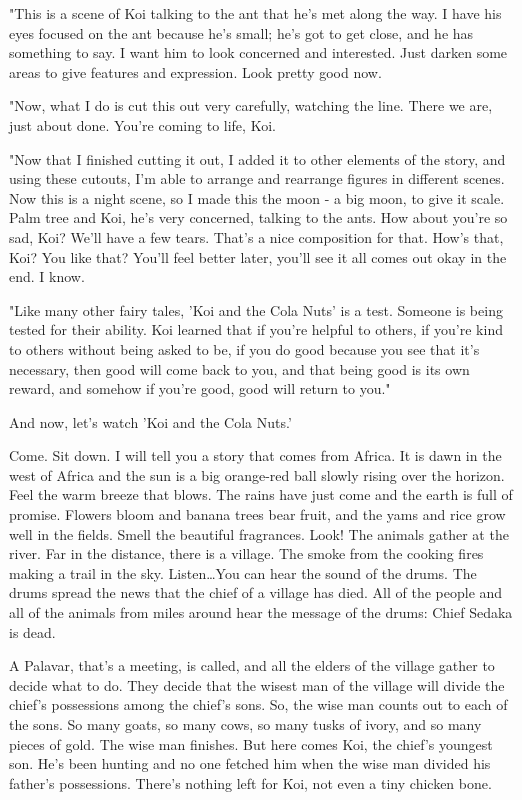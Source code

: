 "This is a scene of Koi talking to the ant that he's met along the way. I have his eyes focused on the ant because he's small; he's got to get close, and he has something to say. I want him to look concerned and interested. Just darken some areas to give features and expression. Look pretty good now.

"Now, what I do is cut this out very carefully, watching the line. There we are, just about done. You're coming to life, Koi.

"Now that I finished cutting it out, I added it to other elements of the story, and using these cutouts, I'm able to arrange and rearrange figures in different scenes. Now this is a night scene, so I made this the moon - a big moon, to give it scale. Palm tree and Koi, he's very concerned, talking to the ants. How about you're so sad, Koi? We'll have a few tears. That's a nice composition for that. How's that, Koi? You like that? You'll feel better later, you'll see it all comes out okay in the end. I know.

"Like many other fairy tales, 'Koi and the Cola Nuts' is a test. Someone is being tested for their ability. Koi learned that if you're helpful to others, if you're kind to others without being asked to be, if you do good because you see that it's necessary, then good will come back to you, and that being good is its own reward, and somehow if you're good, good will return to you."

And now, let's watch 'Koi and the Cola Nuts.'

Come. Sit down. I will tell you a story that comes from Africa. It is dawn in the west of Africa and the sun is a big orange-red ball slowly rising over the horizon. Feel the warm breeze that blows. The rains have just come and the earth is full of promise. Flowers bloom and banana trees bear fruit, and the yams and rice grow well in the fields. Smell the beautiful fragrances. Look! The animals gather at the river. Far in the distance, there is a village. The smoke from the cooking fires making a trail in the sky. Listen\dots You can hear the sound of the drums. The drums spread the news that the chief of a village has died. All of the people and all of the animals from miles around hear the message of the drums: Chief Sedaka is dead.

A Palavar, that's a meeting, is called, and all the elders of the village gather to decide what to do. They decide that the wisest man of the village will divide the chief's possessions among the chief's sons. So, the wise man counts out to each of the sons. So many goats, so many cows, so many tusks of ivory, and so many pieces of gold. The wise man finishes. But here comes Koi, the chief's youngest son. He's been hunting and no one fetched him when the wise man divided his father's possessions. There's nothing left for Koi, not even a tiny chicken bone.

